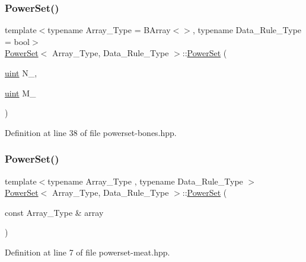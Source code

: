 \subsubsection{\texorpdfstring{Power\+Set()}{PowerSet()}\hspace{0.1cm}{\footnotesize\ttfamily [2/3]}}
{\footnotesize\ttfamily template$<$typename Array\+\_\+\+Type  = B\+Array$<$$>$, typename Data\+\_\+\+Rule\+\_\+\+Type  = bool$>$ \\
\hyperlink{class_power_set}{Power\+Set}$<$ Array\+\_\+\+Type, Data\+\_\+\+Rule\+\_\+\+Type $>$\+::\hyperlink{class_power_set}{Power\+Set} (\begin{DoxyParamCaption}\item[{\hyperlink{typedefs_8hpp_a91ad9478d81a7aaf2593e8d9c3d06a14}{uint}}]{N\+\_\+,  }\item[{\hyperlink{typedefs_8hpp_a91ad9478d81a7aaf2593e8d9c3d06a14}{uint}}]{M\+\_\+ }\end{DoxyParamCaption})\hspace{0.3cm}{\ttfamily [inline]}}



Definition at line 38 of file powerset-\/bones.\+hpp.

\mbox{\label{class_power_set_acc20a68ff11aa1891d9a0676ed50808f}} 
\subsubsection{\texorpdfstring{Power\+Set()}{PowerSet()}\hspace{0.1cm}{\footnotesize\ttfamily [3/3]}}
{\footnotesize\ttfamily template$<$typename Array\+\_\+\+Type , typename Data\+\_\+\+Rule\+\_\+\+Type $>$ \\
\hyperlink{class_power_set}{Power\+Set}$<$ Array\+\_\+\+Type, Data\+\_\+\+Rule\+\_\+\+Type $>$\+::\hyperlink{class_power_set}{Power\+Set} (\begin{DoxyParamCaption}\item[{const Array\+\_\+\+Type \&}]{array }\end{DoxyParamCaption})\hspace{0.3cm}{\ttfamily [inline]}}



Definition at line 7 of file powerset-\/meat.\+hpp.

\mbox{\label{class_power_set_a89a176c9517e81a066adffad3c46aba5}} 

